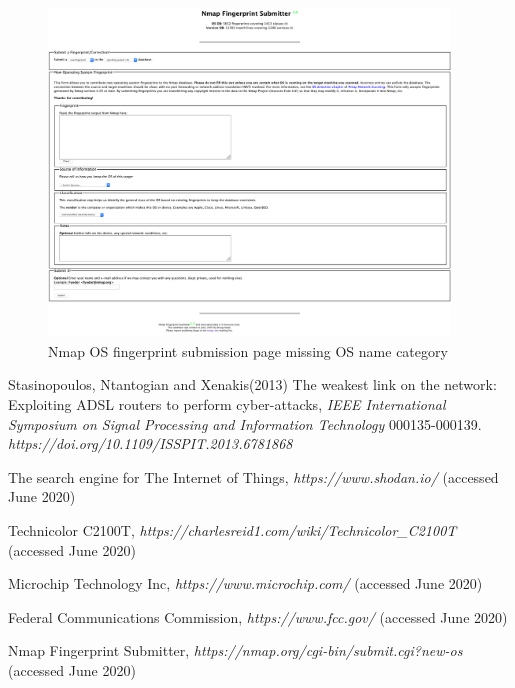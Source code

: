 \documentclass[10pt]{article}
\begin{document}
\begin{figure}[H]
\centering
\includegraphics[width=0.95\textwidth]{bug.png}
\caption{Nmap OS fingerprint submission page missing OS name category}\label{bug image}
\end{figure}

\begin{thebibliography}{9} 

 Stasinopoulos, Ntantogian and  Xenakis(2013) The weakest link on the network: Exploiting ADSL routers to perform cyber-attacks, \textit{IEEE International Symposium on Signal Processing and Information Technology} 000135-000139. \textit {https://doi.org/10.1109/ISSPIT.2013.6781868}

 The search engine for The Internet of Things, \textit{https://www.shodan.io/} (accessed June 2020)

 Technicolor C2100T, \textit{https://charlesreid1.com/wiki/Technicolor\_C2100T} (accessed June 2020)

 Microchip Technology Inc, \textit{https://www.microchip.com/} (accessed June 2020)

 Federal Communications Commission, \textit{https://www.fcc.gov/} (accessed June 2020)

 Nmap Fingerprint Submitter, \textit{https://nmap.org/cgi-bin/submit.cgi?new-os} (accessed June 2020)

\end{thebibliography}
\end{document}
